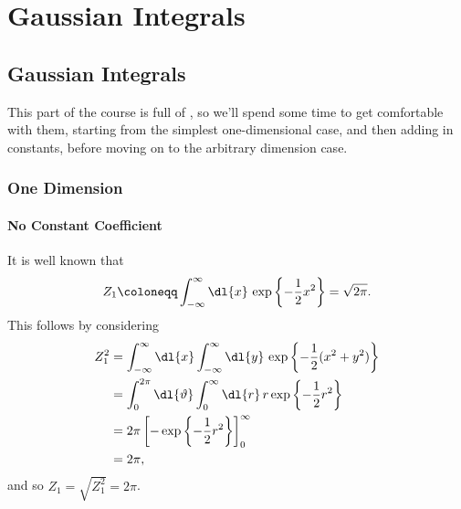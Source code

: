 \documentclass[fleqn]{NotesClass}
\newcommand{\interaction}{\symrm{I}}
\begin{document}
    
    
    
    
    
    
    
    
    
    
    
    
    
    
    
    
    
    
    
    
    
    
    
    
    
    
    \renewcommand{\interaction}{\text{int}}
    
    \part{Gaussian Integrals}
    \chapter{Gaussian Integrals}
    This part of the course is full of , so we'll spend some time to get comfortable with them, starting from the simplest one-dimensional case, and then adding in constants, before moving on to the arbitrary dimension case.
    \section{One Dimension}
    \subsection{No Constant Coefficient}
    It is well known that
    \begin{equation}
        Z_{1} \coloneqq \int_{-\infty}^{\infty} \dl{x} \, \exp\left\{ -\frac{1}{2}x^2 \right\} = \sqrt{2\pi}.
    \end{equation}
    This follows by considering
    \begin{align}
        Z_{1}^2 &= \int_{-\infty}^{\infty} \dl{x} \int_{-\infty}^{\infty} \dl{y} \, \exp\left\{ -\frac{1}{2}(x^2 + y^2) \right\}\\
        &= \int_{0}^{2\pi} \dl{\vartheta} \int_{0}^{\infty} \dl{r} \, r \exp\left\{ -\frac{1}{2}r^2 \right\}\\
        &= 2\pi \left[ -\exp\left\{ -\frac{1}{2}r^2 \right\} \right]_{0}^{\infty}\\
        &= 2\pi,
    \end{align}
    and so \(Z_1 = \sqrt{Z_1^2} = 2\pi\).
    
\end{document}
